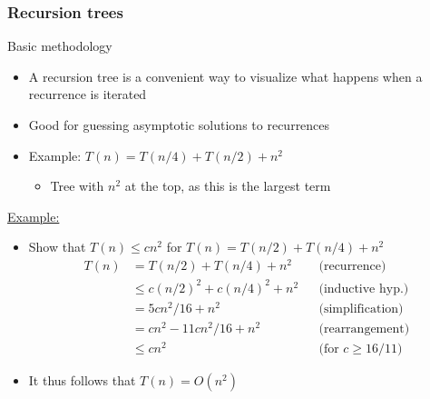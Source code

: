 \subsubsection{Recursion trees}
Basic methodology
\begin{itemize}
    \item A recursion tree is a convenient way to visualize what happens when a recurrence is iterated
    \item Good for guessing asymptotic solutions to recurrences
    \item Example: $T(n)=T(n/4)+T(n/2)+n^2$
    \begin{itemize}
        \item Tree with $n^2$ at the top, as this is the largest term
    \end{itemize}
\end{itemize}
\underline{Example:}
\begin{itemize}
    \item Show that $T(n)\leq cn^2$ for $T(n)=T(n/2) + T(n/4) + n^2$
    \begin{align*}
        T(n)&= T(n/2)+T(n/4)+n^2 &&\text{(recurrence)}\\
        &\leq c(n/2)^2 + c(n/4)^2 + n^2 &&\text{(inductive hyp.)}\\
        &= 5cn^2 /16 +n^2 &&\text{(simplification)} \\
        &= cn^2 - 11cn^2/16 +n^2 &&\text{(rearrangement)}\\
        &\leq cn^2 &&\text{(for $c\geq 16/11$)}
    \end{align*}
    \item It thus follows that $T(n)=O(n^2)$
\end{itemize}

